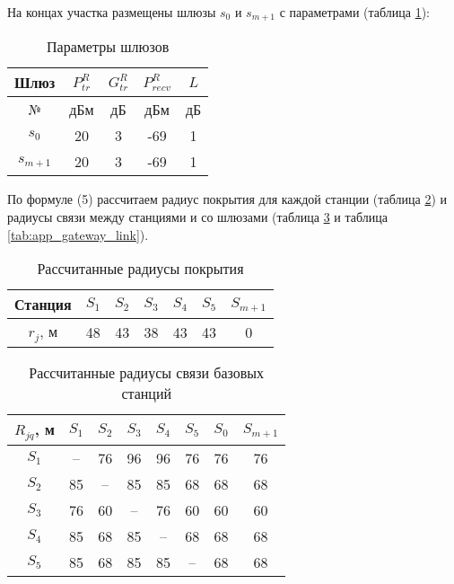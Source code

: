   На концах участка размещены шлюзы $s_0 $ и $s_{m+1}$ с параметрами (таблица \cref{tab:app_gateway_parameters}):

  \begin{table}[h!]\centering
    \begin{tabular}{|c||c|c|c|c|}\hline
        
        Шлюз&	$P_{tr}^R$&	$G_{tr}^R$&	$P_{recv}^R$&	$L$ \\
        \hline
        №&	дБм&	дБ&	дБм&	дБ	 \\
        \hline
        $s_0 $&	20&	3&	-69&	1 \\
        $s_{m+1}$&	20&	3&	-69&	1 \\
        \hline

  \end{tabular}\caption{Параметры шлюзов}\label{tab:app_gateway_parameters}
  \end{table}

  По формуле (5) рассчитаем радиус покрытия для каждой станции (таблица \cref{tab:app_sta_coverage}) и радиусы связи между станциями и со шлюзами (таблица \cref{tab:app_sta_link} и таблица \cref{tab:app_gateway_link}).

  \begin{table}[h!]\centering
    \begin{tabular}{|c||c c c c c c|}\hline
        
        Станция&	$S_1$& $S_2$& $S_3$& $S_4$& $S_5$& $S_{m+1}$\\
        \hline
        $r_j$, м&	48&	43&	38&	43&	43&	0\\
        \hline

  \end{tabular}\caption{Рассчитанные радиусы покрытия}\label{tab:app_sta_coverage}
  \end{table}

  \begin{table}[h!]\centering
    \begin{tabular}{|c|c c c c c c c|}\hline
        
        $R_{jq}$, м&	$S_1$& $S_2$& $S_3$& $S_4$& $S_5$& $S_0$& $S_{m+1}$\\
        \hline
        $S_1$& --&	76&	96&	96&	76&	76&	76\\
        $S_2$& 85&	--&	85&	85&	68&	68&	68\\
        $S_3$& 76&	60&	--&	76&	60&	60&	60\\
        $S_4$& 85&	68&	85&	--&	68&	68&	68\\
        $S_5$& 85&	68&	85&	85&	--&	68&	68\\

        \hline
  \end{tabular}\caption{Рассчитанные радиусы связи базовых станций}\label{tab:app_sta_link}
  \end{table}

